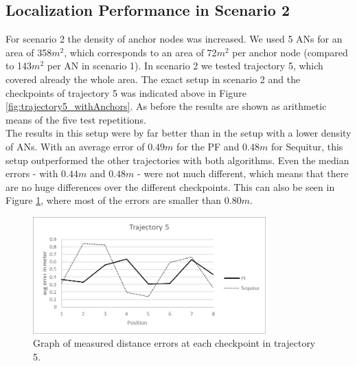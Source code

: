 
\subsection{Localization Performance in Scenario 2}
For scenario 2 the density of anchor nodes was increased. We used 5 ANs for an area of 358$m^2$, which corresponds to an area of 72$m^2$ per anchor node (compared to 143$m^2$ per AN in scenario 1). In scenario 2 we tested trajectory 5, which covered already the whole area. The exact setup in scenario 2 and the checkpoints of trajectory 5 was indicated above in Figure \ref{fig:trajectory5_withAnchors}. As before the results are shown as arithmetic means of the five test repetitions.\\
\noindent\hspace*{5mm}%
The results in this setup were by far better than in the setup with a lower density of ANs. With an average error of $0.49m$ for the PF and $0.48m$ for Sequitur, this setup outperformed the other trajectories with both algorithms. Even the median errors - with $0.44m$ and $0.48m$ -  were not much different, which means that there are no huge differences over the different checkpoints. This can also be seen in Figure \ref{fig:trajectory5_results}, where most of the errors are smaller than $0.80m$.

\begin{figure}[th]
\centering
\includegraphics[width=0.8\textwidth]{Figures/trajectory5_results}
\decoRule
\caption[Positioning Results Trajectory 5]{Graph of measured distance errors at each checkpoint in trajectory 5.}
\label{fig:trajectory5_results}
\end{figure}

